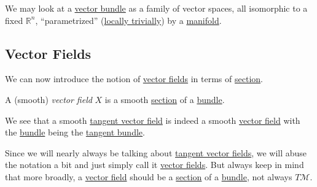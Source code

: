 \begin{intuition}
	We may look at a \hyperref[def:vector-bundle]{vector bundle} as a family of vector spaces, all isomorphic to a fixed \(\mathbb{R} ^n\), ``parametrized'' (\hyperref[def:local-trivialization]{locally trivially}) by a \hyperref[def:smooth-manifold]{manifold}.
\end{intuition}

\subsection{Vector Fields}
We can now introduce the notion of \hyperref[def:vector-field]{vector fields} in terms of \hyperref[def:section]{section}.

\begin{definition}\label{def:vector-field*}
	A (smooth) \emph{vector field} \(X\) is a smooth \hyperref[def:section]{section} of a \hyperref[def:bundle]{bundle}.
\end{definition}

\begin{note}
	We see that a smooth \hyperref[def:vector-field]{tangent vector field} is indeed a smooth \hyperref[def:vector-field*]{vector field} with the \hyperref[def:bundle]{bundle} being the \hyperref[def:tangent-bundle]{tangent bundle}.
\end{note}

\begin{notation}
	Since we will nearly always be talking about \hyperref[def:vector-field]{tangent vector fields}, we will abuse the notation a bit and just simply call it \hyperref[def:vector-field]{vector fields}. But always keep in mind that more broadly, a \hyperref[def:vector-field*]{vector field} should be a \hyperref[def:section]{section} of a \hyperref[def:bundle]{bundle}, not always \(T \mathcal{M} \).
\end{notation}